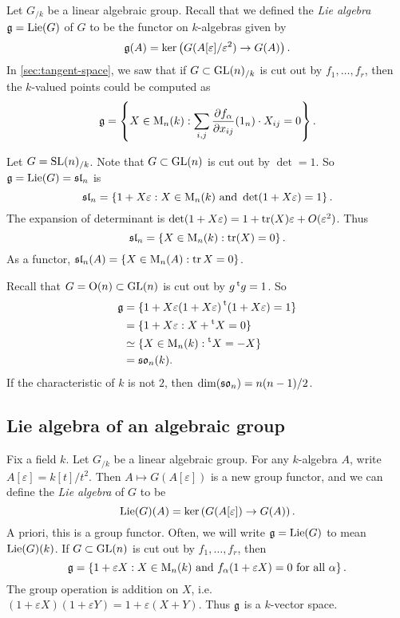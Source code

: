 Let $G_{/k}$ be a linear algebraic group. Recall that we defined the \emph{Lie 
algebra} $\mathfrak{g}=\operatorname{Lie}(G)$ of $G$ to be the functor on $k$-algebras given by 
\[
  \mathfrak{g}(A) = \ker\left(G(A[\varepsilon]/\varepsilon^2) \to G(A)\right) .
\]
In \autoref{sec:tangent-space}, we saw that if $G\subset \operatorname{GL}(n)_{/k}$ is cut out by 
$f_1,\dots,f_r$, then the $k$-valued points could be computed as 
\[
  \mathfrak{g} = \left\{X\in \operatorname{M}_n(k):\sum_{i,j} \frac{\partial f_\alpha}{\partial x_{i j}}(1_n)\cdot X_{i j}=0\right\} .
\]

\begin{example}
Let $G=\operatorname{SL}(n)_{/k}$. Note that $G\subset \operatorname{GL}(n)$ is cut out by $\det=1$. So 
$\mathfrak{g}=\operatorname{Lie}(G)=\mathfrak{sl}_n$ is 
\[
  \mathfrak{sl}_n = \left\{1+X\varepsilon:X\in \operatorname{M}_n(k)\text{ and }\det(1+X\varepsilon)=1\right\} .
\]
The expansion of determinant is 
$\det(1+X\varepsilon)=1+\operatorname{tr}(X)\varepsilon + O(\varepsilon^2)$. Thus 
\[
  \mathfrak{sl}_n = \left\{X\in \operatorname{M}_n(k):\operatorname{tr}(X)=0\right\} .
\]
As a functor, $\mathfrak{sl}_n(A)=\{X\in \operatorname{M}_n(A):\operatorname{tr} X=0\}$. 
\end{example}

\begin{example}[Orthogonal]
Recall that $G=\operatorname{O}(n)\subset \operatorname{GL}(n)$ is cut out by $g \prescript{\mathrm{t}}{}{g}=1$. So 
\begin{align*}
  \mathfrak{g}
    &= \{1+X\varepsilon  (1+X\varepsilon) \prescript{\mathrm{t}}{}{(1+X\varepsilon)}=1\} \\
    &= \{1+X\varepsilon:X+\prescript{\mathrm{t}}{}{X}=0\} \\
    &\simeq \{X\in \operatorname{M}_n(k):\prescript{\mathrm{t}}{}{X}=-X\} \\
    &= \mathfrak{so}_n(k) .
\end{align*}
If the characteristic of $k$ is not $2$, then $\dim(\mathfrak{so}_n)=n(n-1)/2$. 
\end{example}





\subsection{Lie algebra of an algebraic group}\label{sec:lie-alg-of-group}

Fix a field $k$. Let $G_{/k}$ be a linear algebraic group. For any $k$-algebra 
$A$, write $A[\varepsilon]=k[t]/t^2$. Then $A\mapsto G(A[\varepsilon])$ is a 
new group functor, and we can define the \emph{Lie algebra} of $G$ to be 
\[
  \operatorname{Lie}(G)(A) = \ker\left(G(A[\varepsilon]) \to G(A)\right) .
\]
A priori, this is a group functor. Often, we will write $\mathfrak{g}=\operatorname{Lie}(G)$ to mean 
$\operatorname{Lie}(G)(k)$. If $G\subset \operatorname{GL}(n)$ is cut out by $f_1,\dots,f_r$, then 
\[
  \mathfrak{g}=\left\{1+\varepsilon X:X\in \operatorname{M}_n(k)\text{ and }f_\alpha(1+\varepsilon X)=0\text{ for all }\alpha\right\} .
\]
The group operation is addition on $X$, 
i.e.~$(1+\varepsilon X)(1+\varepsilon Y)=1+\varepsilon(X+Y)$. Thus 
$\mathfrak{g}$ is a $k$-vector space. 

